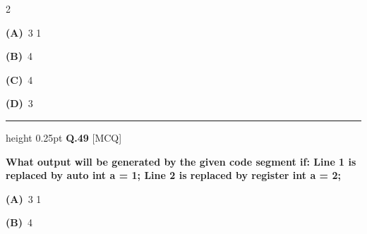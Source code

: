\documentclass[a4paper,10pt,twoside]{article}
\begin{document}
\begin{multicols}{2}
\par\vspace{2pt}\noindent
\textbf{(A)}~3 1    \par\vspace{2pt}\noindent
\textbf{(B)}~4     \par\vspace{2pt}\noindent
\textbf{(C)}~4     \par\vspace{2pt}\noindent
\textbf{(D)}~3     
\par\vspace{6pt}\hrule height 0.25pt\vspace{6pt}
\noindent\textbf{Q.49} \hfill {\footnotesize\textsf{[MCQ]}}
\par\vspace{2pt}
{\bfseries What output will be generated by the given code segment if:
Line 1 is replaced by auto int a = 1;
Line 2 is replaced by register int a = 2; \par}
\par\vspace{2pt}\noindent
\textbf{(A)}~3 1    \par\vspace{2pt}\noindent
\textbf{(B)}~4     \par\vspace{2pt}\noindent

\end{multicols}
\end{document}

